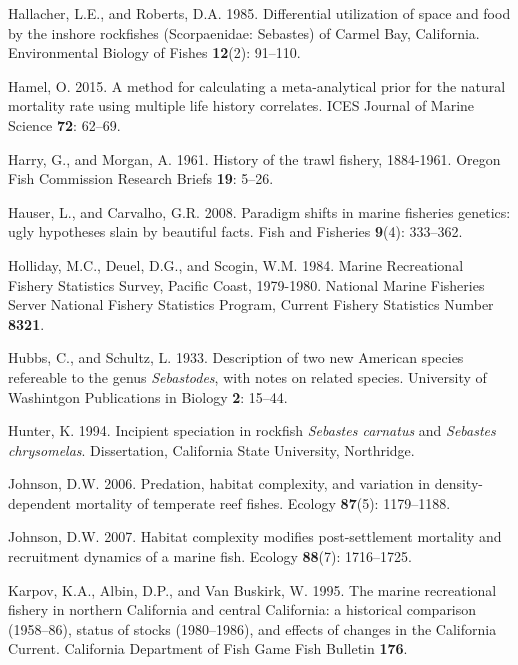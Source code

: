 \documentclass[12pt,]{article}
\begin{document}
\hypertarget{ref-Hallacher1985}{}
Hallacher, L.E., and Roberts, D.A. 1985. Differential utilization of
space and food by the inshore rockfishes (Scorpaenidae: Sebastes) of
Carmel Bay, California. Environmental Biology of Fishes \textbf{12}(2):
91--110.

\hypertarget{ref-Hamel2015}{}
Hamel, O. 2015. A method for calculating a meta-analytical prior for the
natural mortality rate using multiple life history correlates. ICES
Journal of Marine Science \textbf{72}: 62--69.

\hypertarget{ref-Harry1961}{}
Harry, G., and Morgan, A. 1961. History of the trawl fishery, 1884-1961.
Oregon Fish Commission Research Briefs \textbf{19}: 5--26.

\hypertarget{ref-Hauser2008}{}
Hauser, L., and Carvalho, G.R. 2008. Paradigm shifts in marine fisheries
genetics: ugly hypotheses slain by beautiful facts. Fish and Fisheries
\textbf{9}(4): 333--362.

\hypertarget{ref-Holliday1984}{}
Holliday, M.C., Deuel, D.G., and Scogin, W.M. 1984. Marine Recreational
Fishery Statistics Survey, Pacific Coast, 1979-1980. National Marine
Fisheries Server National Fishery Statistics Program, Current Fishery
Statistics Number \textbf{8321}.

\hypertarget{ref-Hubbs1933}{}
Hubbs, C., and Schultz, L. 1933. Description of two new American species
refereable to the genus \emph{Sebastodes}, with notes on related
species. University of Washintgon Publications in Biology \textbf{2}:
15--44.

\hypertarget{ref-Hunter1994}{}
Hunter, K. 1994. Incipient speciation in rockfish \emph{Sebastes
carnatus} and \emph{Sebastes chrysomelas}. Dissertation, California
State University, Northridge.

\hypertarget{ref-Johnson2006}{}
Johnson, D.W. 2006. Predation, habitat complexity, and variation in
density-dependent mortality of temperate reef fishes. Ecology
\textbf{87}(5): 1179--1188.

\hypertarget{ref-Johnson2007}{}
Johnson, D.W. 2007. Habitat complexity modifies post-settlement
mortality and recruitment dynamics of a marine fish. Ecology
\textbf{88}(7): 1716--1725.

\hypertarget{ref-Karpov1995}{}
Karpov, K.A., Albin, D.P., and Van Buskirk, W. 1995. The marine
recreational fishery in northern California and central California: a
historical comparison (1958--86), status of stocks (1980--1986), and
effects of changes in the California Current. California Department of
Fish Game Fish Bulletin \textbf{176}.
\end{document}
